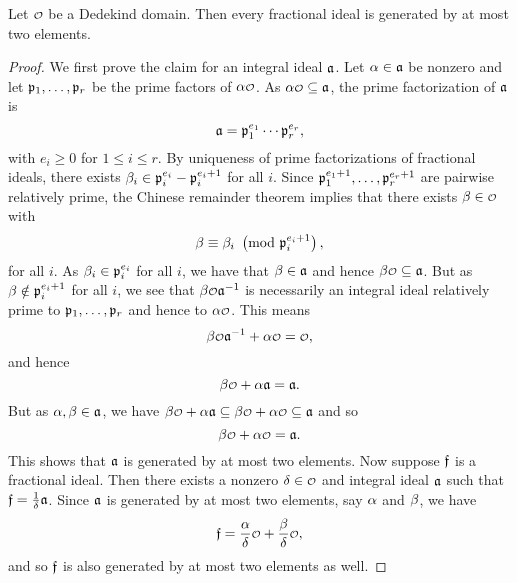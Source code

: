     \begin{proposition}\label{prop:fractional_ideal_generated_by_two_elements}
      Let $\smc{O}$ be a Dedekind domain. Then every fractional ideal is generated by at most two elements.
    \end{proposition}
    \begin{proof}
      We first prove the claim for an integral ideal $\mathfrak{a}$. Let $\alpha \in \mathfrak{a}$ be nonzero and let $\mathfrak{p}_{1},\ldots,\mathfrak{p}_{r}$ be the prime factors of $\a\smc{O}$. As $\a\smc{O} \subseteq \mf{a}$, the prime factorization of $\mathfrak{a}$ is
      \[
        \mathfrak{a} = \mathfrak{p}_{1}^{e_{1}} \cdots \mathfrak{p}_{r}^{e_{r}},
      \]
      with $e_{i} \ge 0$ for $1 \le i \le r$. By uniqueness of prime factorizations of fractional ideals, there exists $\beta_{i} \in \mathfrak{p}_{i}^{e_{i}}-\mathfrak{p}_{i}^{e_{i}+1}$ for all $i$. Since $\mathfrak{p}_{1}^{e_{1}+1},\ldots,\mathfrak{p}_{r}^{e_{r}+1}$ are pairwise relatively prime, the Chinese remainder theorem implies that there exists $\b \in \smc{O}$ with 
      \[
        \beta \equiv \beta_{i} \ \left(\text{mod }\mathfrak{p}_{i}^{e_{i}+1}\right),
      \]
      for all $i$. As $\beta_{i} \in \mathfrak{p}_{i}^{e_{i}}$ for all $i$, we have that $\beta \in \mathfrak{a}$ and hence $\b\smc{O} \subseteq \mf{a}$. But as $\beta \notin \mathfrak{p}_{i}^{e_{i}+1}$ for all $i$, we see that $\b\smc{O}\mf{a}^{-1}$ is necessarily an integral ideal relatively prime to $\mathfrak{p}_{1},\ldots,\mathfrak{p}_{r}$ and hence to $\a\smc{O}$. This means
      \[
        \b\smc{O}\mf{a}^{-1}+\a\smc{O} = \smc{O},
      \]
      and hence
      \[
        \b\smc{O}+\a\mf{a} = \mf{a}.
      \]
      But as $\alpha,\beta \in \mathfrak{a}$, we have $\b\smc{O}+\a\mf{a} \subseteq \b\smc{O}+\a\smc{O} \subseteq \mf{a}$ and so
      \[
        \b\smc{O}+\a\smc{O} = \mf{a}.
      \]
      This shows that $\mathfrak{a}$ is generated by at most two elements. Now suppose $\mathfrak{f}$ is a fractional ideal. Then there exists a nonzero $\d \in \smc{O}$ and integral ideal $\mathfrak{a}$ such that $\mathfrak{f} = \frac{1}{\delta}\mathfrak{a}$. Since $\mathfrak{a}$ is generated by at most two elements, say $\alpha$ and $\beta$, we have
      \[
        \mf{f} = \frac{\a}{\d}\smc{O}+\frac{\b}{\d}\smc{O},
      \]
      and so $\mathfrak{f}$ is also generated by at most two elements as well.
    \end{proof}

